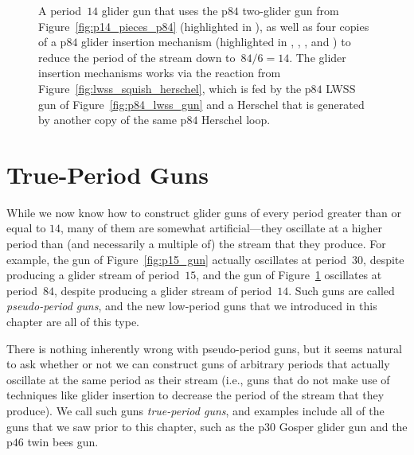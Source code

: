 \begin{figure}[!htbp]
	\centering
	\caption{A period~$14$ glider gun that uses the p$84$ two-glider gun from Figure~\ref{fig:p14_pieces_p84} (highlighted in ), as well as four copies of a p$84$ glider insertion mechanism (highlighted in , , , and ) to reduce the period of the stream down to~$84/6 = 14$. The glider insertion mechanisms works via the reaction from Figure~\ref{fig:lwss_squish_herschel}, which is fed by the p$84$ LWSS gun of Figure~\ref{fig:p84_lwss_gun} and a Herschel that is generated by another copy of the same p$84$ Herschel loop.}\label{fig:p14_gun}
\end{figure}



\section{True-Period Guns}\label{sec:true_period_guns}

While we now know how to construct glider guns of every period greater than or equal to $14$, many of them are somewhat artificial---they oscillate at a higher period than (and necessarily a multiple of) the stream that they produce. For example, the gun of Figure~\ref{fig:p15_gun} actually oscillates at period~$30$, despite producing a glider stream of period~$15$, and the gun of Figure~\ref{fig:p14_gun} oscillates at period~$84$, despite producing a glider stream of period~$14$. Such guns are called \emph{pseudo-period guns}, and the new low-period guns that we introduced in this chapter are all of this type.

There is nothing inherently wrong with pseudo-period guns, but it seems natural to ask whether or not we can construct guns of arbitrary periods that actually oscillate at the same period as their stream (i.e., guns that do not make use of techniques like glider insertion to decrease the period of the stream that they produce). We call such guns \emph{true-period guns}, and examples include all of the guns that we saw prior to this chapter, such as the p$30$ Gosper glider gun and the p$46$ twin bees gun.

